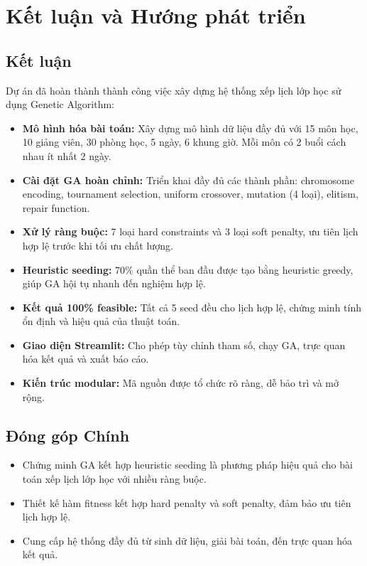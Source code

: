 \section{Kết luận và Hướng phát triển}

\subsection{Kết luận}
Dự án đã hoàn thành thành công việc xây dựng hệ thống xếp lịch lớp học sử dụng Genetic Algorithm:

\begin{itemize}
    \item \textbf{Mô hình hóa bài toán:} Xây dựng mô hình dữ liệu đầy đủ với 15 môn học, 10 giảng viên, 30 phòng học, 5 ngày, 6 khung giờ. Mỗi môn có 2 buổi cách nhau ít nhất 2 ngày.

    \item \textbf{Cài đặt GA hoàn chỉnh:} Triển khai đầy đủ các thành phần: chromosome encoding, tournament selection, uniform crossover, mutation (4 loại), elitism, repair function.

    \item \textbf{Xử lý ràng buộc:} 7 loại hard constraints và 3 loại soft penalty, ưu tiên lịch hợp lệ trước khi tối ưu chất lượng.

    \item \textbf{Heuristic seeding:} 70\% quần thể ban đầu được tạo bằng heuristic greedy, giúp GA hội tụ nhanh đến nghiệm hợp lệ.

    \item \textbf{Kết quả 100\% feasible:} Tất cả 5 seed đều cho lịch hợp lệ, chứng minh tính ổn định và hiệu quả của thuật toán.

    \item \textbf{Giao diện Streamlit:} Cho phép tùy chỉnh tham số, chạy GA, trực quan hóa kết quả và xuất báo cáo.

    \item \textbf{Kiến trúc modular:} Mã nguồn được tổ chức rõ ràng, dễ bảo trì và mở rộng.
\end{itemize}

\subsection{Đóng góp Chính}
\begin{itemize}
    \item Chứng minh GA kết hợp heuristic seeding là phương pháp hiệu quả cho bài toán xếp lịch lớp học với nhiều ràng buộc.
    \item Thiết kế hàm fitness kết hợp hard penalty và soft penalty, đảm bảo ưu tiên lịch hợp lệ.
    \item Cung cấp hệ thống đầy đủ từ sinh dữ liệu, giải bài toán, đến trực quan hóa kết quả.
\end{itemize}

